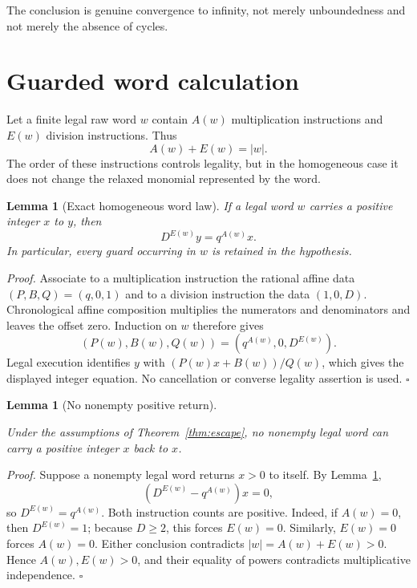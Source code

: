 \documentclass[11pt,letterpaper]{article}
\newtheorem{lemma}[theorem]{Lemma}
\newenvironment{proof}{\noindent\textit{Proof.}}{\hfill\(\square\)}
\begin{document}
The conclusion is genuine convergence to infinity, not merely unboundedness
and not merely the absence of cycles.

\section{Guarded word calculation}

Let a finite legal raw word $w$ contain $A(w)$ multiplication instructions
and $E(w)$ division instructions.  Thus
\[
 A(w)+E(w)=|w|.
\]
The order of these instructions controls legality, but in the homogeneous
case it does not change the relaxed monomial represented by the word.

\begin{lemma}[Exact homogeneous word law]\label{lem:word}
If a legal word $w$ carries a positive integer $x$ to $y$, then
\[
 D^{E(w)}y=q^{A(w)}x.
\]
In particular, every guard occurring in $w$ is retained in the hypothesis.
\end{lemma}

\begin{proof}
Associate to a multiplication instruction the rational affine data
$(P,B,Q)=(q,0,1)$ and to a division instruction the data $(1,0,D)$.
Chronological affine composition multiplies the numerators and denominators
and leaves the offset zero.  Induction on $w$ therefore gives
\[
 (P(w),B(w),Q(w))=(q^{A(w)},0,D^{E(w)}).
\]
Legal execution identifies $y$ with
$(P(w)x+B(w))/Q(w)$, which gives the displayed integer equation.  No
cancellation or converse legality assertion is used.
\end{proof}

\begin{lemma}[No nonempty positive return]\label{lem:noreturn}
\leavevmode\par
Under the assumptions of Theorem~\ref{thm:escape}, no nonempty legal word
can carry a positive integer $x$ back to $x$.
\end{lemma}

\begin{proof}
Suppose a nonempty legal word returns $x>0$ to itself.  By
Lemma~\ref{lem:word},
\[
 (D^{E(w)}-q^{A(w)})x=0,
\]
so $D^{E(w)}=q^{A(w)}$.  Both instruction counts are positive.  Indeed, if
$A(w)=0$, then $D^{E(w)}=1$; because $D\geq2$, this forces $E(w)=0$.
Similarly, $E(w)=0$ forces $A(w)=0$.  Either conclusion contradicts
$|w|=A(w)+E(w)>0$.  Hence $A(w),E(w)>0$, and their equality of powers
contradicts multiplicative independence.
\end{proof}
\end{document}
